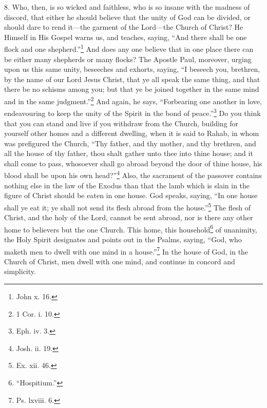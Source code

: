 8. Who, then, is so wicked and faithless, who is so insane with the madness of discord, that either he should believe that the unity of God can be divided, or should dare to rend it—the garment of the Lord—the Church of Christ? He Himself in His Gospel warns us, and teaches, saying, “And there shall be one flock and one shepherd.”\footnote{John x. 16.} And does any one believe that in one place there can be either many shepherds or many flocks? The Apostle Paul, moreover, urging upon us this same unity, beseeches and exhorts, saying, “I beseech you, brethren, by the name of our Lord Jesus Christ, that ye all speak the same thing, and that there be no schisms among you; but that ye be joined together in the same mind and in the same judgment.”\footnote{1 Cor. i. 10.} And again, he says, “Forbearing one another in love, endeavouring to keep the unity of the Spirit in the bond of peace.”\footnote{Eph. iv. 3.} Do you think that you can stand and live if you withdraw from the Church, building for yourself other homes and a different dwelling, when it is said to Rahab, in whom was prefigured the Church, “Thy father, and thy mother, and thy brethren, and all the house of thy father, thou shalt gather unto thee into thine house; and it shall come to pass, whosoever shall go abroad beyond the door of thine house, his blood shall be upon his own head?”\footnote{Josh. ii. 19.} Also, the sacrament of the passover contains nothing else in the law of the Exodus than that the lamb which is slain in the figure of Christ should be eaten in one house. God speaks, saying, “In one house shall ye eat it; ye shall not send its flesh abroad from the house.”\footnote{Ex. xii. 46.} The flesh of Christ, and the holy of the Lord, cannot be sent abroad, nor is there any other home to believers but the one Church. This home, this household\footnote{“Hospitium.”} of unanimity, the Holy Spirit designates and points out in the Psalms, saying, “God, who maketh men to dwell with one mind in a house.”\footnote{Ps. lxviii. 6.} In the house of God, in the Church of Christ, men dwell with one mind, and continue in concord and simplicity.

